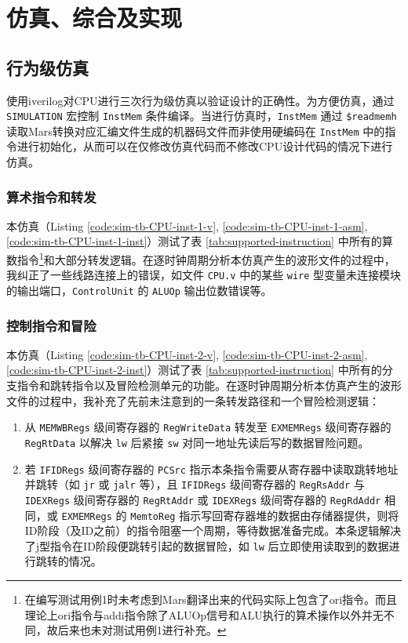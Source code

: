 \section{仿真、综合及实现}


\subsection{行为级仿真}
使用iverilog对CPU进行三次行为级仿真以验证设计的正确性。为方便仿真，通过 \lstinline|SIMULATION| 宏控制 \lstinline|InstMem| 条件编译。当进行仿真时，\lstinline|InstMem| 通过 \lstinline|$readmemh| 读取Mars转换对应汇编文件生成的机器码文件而非使用硬编码在 \lstinline|InstMem| 中的指令进行初始化，从而可以在仅修改仿真代码而不修改CPU设计代码的情况下进行仿真。

\subsubsection{算术指令和转发}
\label{subsubsec:sim-arithmetic-instructions}
本仿真（Listing \ref{code:sim-tb-CPU-inst-1-v}, \ref{code:sim-tb-CPU-inst-1-asm}, \ref{code:sim-tb-CPU-inst-1-inst}）测试了表 \ref{tab:supported-instruction} 中所有的算数指令\footnote{在编写测试用例1时未考虑到Mars翻译出来的代码实际上包含了ori指令。而且理论上ori指令与addi指令除了ALUOp信号和ALU执行的算术操作以外并无不同，故后来也未对测试用例1进行补充。}和大部分转发逻辑。在逐时钟周期分析本仿真产生的波形文件的过程中，我纠正了一些线路连接上的错误，如文件 \lstinline|CPU.v| 中的某些 \lstinline|wire| 型变量未连接模块的输出端口，\lstinline|ControlUnit| 的 \lstinline|ALUOp| 输出位数错误等。

\subsubsection{控制指令和冒险}
\label{subsubsec:sim-control-instructions}
本仿真（Listing \ref{code:sim-tb-CPU-inst-2-v}, \ref{code:sim-tb-CPU-inst-2-asm}, \ref{code:sim-tb-CPU-inst-2-inst}）测试了表 \ref{tab:supported-instruction} 中所有的分支指令和跳转指令以及冒险检测单元的功能。在逐时钟周期分析本仿真产生的波形文件的过程中，我补充了先前未注意到的一条转发路径和一个冒险检测逻辑：
\begin{enumerate}
    \item 从 \lstinline|MEMWBRegs| 级间寄存器的 \lstinline|RegWriteData| 转发至 \lstinline|EXMEMRegs| 级间寄存器的 \lstinline|RegRtData| 以解决 \lstinline|lw| 后紧接 \lstinline|sw| 对同一地址先读后写的数据冒险问题。
    \item 若 \lstinline|IFIDRegs| 级间寄存器的 \lstinline|PCSrc| 指示本条指令需要从寄存器中读取跳转地址并跳转（如 \lstinline|jr| 或 \lstinline|jalr| 等），且 \lstinline|IFIDRegs| 级间寄存器的 \lstinline|RegRsAddr| 与 \lstinline|IDEXRegs| 级间寄存器的 \lstinline|RegRtAddr| 或 \lstinline|IDEXRegs| 级间寄存器的 \lstinline|RegRdAddr| 相同，或 \lstinline|EXMEMRegs| 的 \lstinline|MemtoReg| 指示写回寄存器堆的数据由存储器提供，则将ID阶段（及ID之前）的指令阻塞一个周期，等待数据准备完成。本条逻辑解决了j型指令在ID阶段便跳转引起的数据冒险，如 \lstinline|lw| 后立即使用读取到的数据进行跳转的情况。
\end{enumerate}

